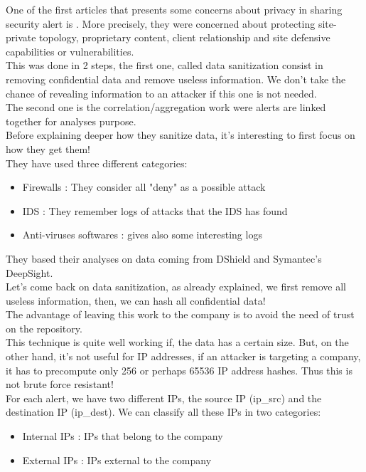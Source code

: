 \documentclass[10pt]{article}
\begin{document}
One of the first articles that presents some concerns about privacy in sharing security alert is \cite{lincoln2004privacy}.
More precisely, they were concerned about protecting site-private topology, proprietary content, client relationship and site defensive capabilities or vulnerabilities.\\
This was done in 2 steps, the first one, called data sanitization consist in removing confidential data and remove useless information. We don't take the chance of revealing information to an attacker if this one is not needed.\\
The second one is the correlation/aggregation work were alerts are linked together for analyses purpose.\\
Before explaining deeper how they sanitize data, it's interesting to first focus on how they get them!\\
 They have used three different categories:
\begin{itemize}
\item Firewalls : They consider all "deny" as a possible attack
\item IDS : They remember logs of attacks that the IDS has found
\item Anti-viruses softwares : gives also some interesting logs
\end{itemize}
They based their analyses on data coming from DShield and Symantec's DeepSight.\\

Let's come back on data sanitization, as already explained, we first remove all useless information, then, we can hash all confidential data!\\
The advantage of leaving this work to the company is to avoid the need of trust on the repository.\\
This technique is quite well working if, the data has a certain size. But, on the other hand, it's not useful for IP addresses, if an attacker is targeting a company, it has to precompute only 256 or perhaps 65536 IP address hashes. Thus this is not brute force resistant!\\
For each alert, we have two different IPs, the source IP (ip\_src) and the destination IP (ip\_dest). We can classify all these IPs in two categories:
\begin{itemize}
	\item Internal IPs : IPs that belong to the company
	\item External IPs : IPs external to the company
\end{itemize}
\end{document}
